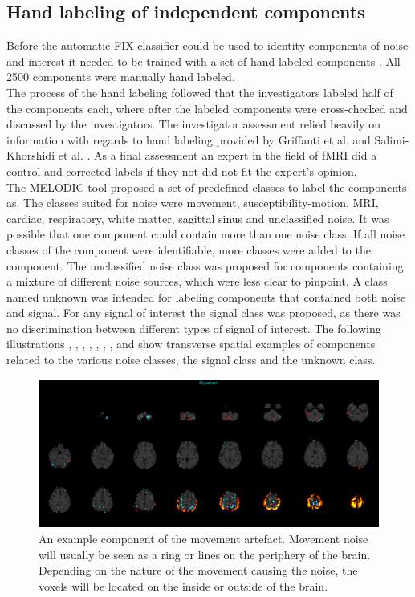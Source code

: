\subsection{Hand labeling of independent components}
Before the automatic FIX classifier could be used to identity components of noise and interest it needed to be trained with a set of hand labeled components \cite{Salimi-Khorshidi2014}. All 2500 components were manually hand labeled. \\
The process of the hand labeling followed that the investigators labeled half of the components each, where after the labeled components were cross-checked and discussed by the investigators. The investigator assessment relied heavily on information with regards to hand labeling provided by Griffanti et al. \cite{Griffanti2017} and Salimi-Khorshidi et al. \cite{Salimi-Khorshidi2014}. As a final assessment an expert in the field of fMRI did a control and corrected labels if they not did not fit the expert's opinion. \\
The MELODIC tool proposed a set of predefined classes to label the components as. The classes suited for noise were movement, susceptibility-motion, MRI, cardiac, respiratory, white matter, sagittal sinus and unclassified noise. It was possible that one component could contain more than one noise class. If all noise classes of the component were identifiable, more classes were added to the component. The unclassified noise class was proposed for components containing a mixture of different noise sources, which were less clear to pinpoint. A class named unknown was intended for labeling components that contained both noise and signal. For any signal of interest the signal class was proposed, as there was no discrimination between different types of signal of interest. 
The following illustrations , , , , , , ,  and  show transverse spatial examples of components related to the various noise classes, the signal class and the unknown class.

\begin{figure}[H]                 
	\includegraphics[width=.85\textwidth]{figures/bMethods/Movement}  
	\caption{An example component of the movement artefact. Movement noise will usually be seen as a ring or lines on the periphery of the brain. Depending on the nature of the movement causing the noise, the voxels will be located on the inside or outside of the brain.}
	\label{fig:meth:Movement} 
\end{figure}


